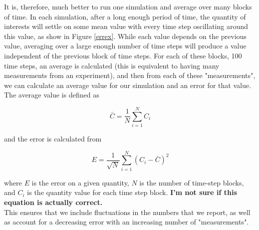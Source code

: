 \documentclass{article}
\begin{document}
\begin{multicols}{2}
It is, therefore, much better to run one simulation and average over many blocks of time.  In each simulation, after a long enough period of time, the quantity of interests will settle on some mean value with every time step oscillating around this value, as show in Figure \ref{errex}.  While each value depends on the previous value, averaging over a large enough number of time steps will produce a value independent of the previous block of time steps.  For each of these blocks, 100 time steps, an average is calculated (this is equivalent to having many measurements from an experiment), and then from each of these "measurements", we can calculate an average value for our simulation and an error for that value.  The average value is defined as 

\begin{equation}
\bar{C} = \frac{1}{N}\sum \limits _{i=1}^N C_i 
\end{equation}

\noindent and the error is calculated from 

\begin{equation}
E = \frac{1}{\sqrt{N}}\sum \limits _{i=1}^N (C_i - \bar{C})^2
\end{equation}

\noindent where $E$ is the error on a given quantity, $N$ is the number of time-step blocks, and $C_i$ is the quantity value for each time step block.  \textbf{I'm not sure if this equation is actually correct.}\\

This ensures that we include fluctuations in the numbers that we report, as well as account for a decreasing error with an increasing number of "measurements".  


\end{multicols}




  
\end{document}
